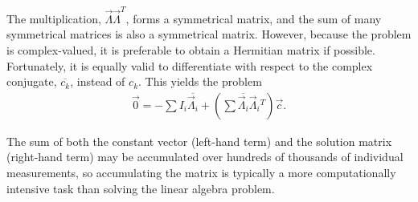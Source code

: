 \documentclass{article}
\begin{document}
The multiplication, $\vec{\Lambda} \vec{\Lambda}^T$, forms a symmetrical matrix, and the sum of many symmetrical matrices is also a symmetrical matrix.  However, because the problem is complex-valued, it is preferable to obtain a Hermitian matrix if possible.  Fortunately, it is equally valid to differentiate with respect to the complex conjugate, $\overline{c_k}$, instead of $c_k$.  This yields the problem
\begin{align}
\vec{0} = -\sum I_i \overline{\vec{\Lambda}_i}  + \left(\sum \overline{\vec{\Lambda}_i} \vec{\Lambda}_i{^T} \right) \vec{c}.
\end{align}

The sum of both the constant vector (left-hand term) and the solution matrix (right-hand term) may be accumulated over hundreds of thousands of individual measurements, so accumulating the matrix is typically a more computationally intensive task than solving the linear algebra problem.
\end{document}
